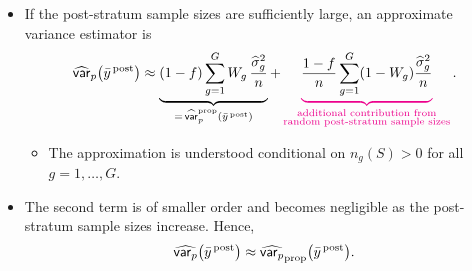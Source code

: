 \documentclass{my_eth_beamer}
\numberwithin{equation}{section}
\begin{document}
\begin{frame}
    \begin{itemize}
    \setlength{\itemsep}{9pt}
        \item If the post-stratum sample sizes are sufficiently large, an
            \alert{approximate variance estimator} is
            \citep[][Remark 7.10.6]{sarndal_swensson_etal_1992}
            \begin{equation*}
                \widehat{\mathsf{var}}_p\big(\bar{y}^{\, \mathrm{post}}\big) \approx
                \underbrace{(1-f)\sum_{g=1}^G
                    W_g\,\frac{\widehat{\sigma}_g^2}{n}}_{
                    =\,\widehat{\mathsf{var}}_p^{\mathrm{prop}}(\bar{y}^{\, \mathrm{post}})} +
                \color{magenta}
                \underbrace{\color{black}
                    \frac{1-f}{n}
                    \sum_{g=1}^G
                    (1-W_g)\frac{\widehat{\sigma}_g^2}{n}}_{
                    \substack{\text{\color{magenta}additional contribution from}\\
                    \text{\color{magenta}random post-stratum sample sizes}}}
                \color{black}.
            \end{equation*}
            \begin{itemize}
                \item[\goto] The approximation is understood
                    \alert{conditional} on $n_g(S)>0$ for all $g = 1, \ldots,
                    G$.
            \end{itemize}
        \item The second term is of smaller order and becomes
            \alert{negligible} as the post-stratum sample sizes increase.
            Hence,
            \begin{equation*}
                \widehat{\mathsf{var}_p}\big(\bar{y}^{\, \mathrm{post}}\big)
                \approx
                \widehat{\mathsf{var}_p}_{\mathrm{prop}}\big(\bar{y}^{\, \mathrm{post}}\big).
            \end{equation*}
    \end{itemize}
\end{frame}
\end{document}
